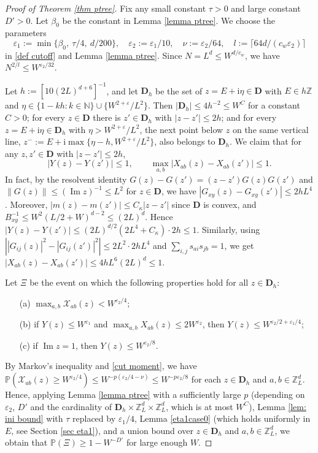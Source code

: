 \documentclass{article}
\newcommand{\1}{\mathds{1}}
\numberwithin{equation}{section}
\newcommand{\be}{\begin{equation}}
\newcommand{\ee}{\end{equation}}
\newcommand{\e}{{\varepsilon}}
\renewcommand{\cal}{\mathcal}
\newcommand{\ii}{\mathrm{i}} %
\renewcommand{\leq}{\leqslant}
\renewcommand{\geq}{\geqslant}
\renewcommand{\le}{\leq}
\renewcommand{\ge}{\geq}
\renewcommand{\P}{\mathbb{P}}
\newcommand{\N}{\mathbb{N}}
\newcommand{\Z}{\mathbb{Z}}
\DeclareMathOperator{\im}{Im}
\theoremstyle{plain} %
\theoremstyle{remark}
\begin{document}
 \begin{proof}[Proof of Theorem \ref{thm ptree}]
 Fix any small constant $\tau>0$ and large constant $D'>0$. Let $\beta_0$ be the constant in Lemma \ref{lemma ptree}. We choose the parameters
 	\be\label{net choice}
 	\e_1:=\min\{\beta_0,\ \tau/4,\ d/200\},\quad \e_2:=\e_1/10,\quad \nu:=\e_2/64,\quad l:=\lceil 64 d/(c_w\e_2)\rceil
 	\ee
in \eqref{def cutoff} and Lemma \ref{lemma ptree}. Since $N=L^d\le W^{d/c_w}$, we have $N^{2/l}\le W^{\e_2/32}$.

\medskip
{} Let $h:=[10(2L)^{d+6}]^{-1}$, and let $\mathbf D_h$ be the set of $z=E+\ii\eta\in \mathbf D$ with $E\in h\Z$ and $\eta\in \{1-kh: k\in \N\}\cup\{W^{2+\e}/L^2\}$. Then $|\mathbf D_h|\le 4h^{-2}\le W^{C}$ for a constant $C>0$; for every $z\in \mathbf D$ there is $z'\in \mathbf D_h$ with $|z-z'|\le 2h$; and for every $z=E+\ii \eta\in \mathbf D_h$ with $\eta>W^{2+\e}/L^2$, the next point below $z$ on the same vertical line, $z^-:=E+\ii\max\{\eta-h,W^{2+\e}/L^2\}$, also belongs to $\mathbf D_h$. We claim that for any $z,z'\in \mathbf D$ with $|z-z'|\le 2h$,
\be\label{net lip}
|Y(z)-Y(z')|\le 1,\qquad \max_{a,b}|X_{ab}(z)-X_{ab}(z')|\le 1.
\ee
In fact, by the resolvent identity $G(z)-G(z')=(z-z')G(z)G(z')$ and $\|G(z)\|\le (\im z)^{-1}\le L^2$ for $z\in \mathbf D$, we have $|G_{xy}(z)-G_{xy}(z')|\le 2hL^4$. Moreover, $|m(z)-m(z')|\le C_\kappa |z-z'|$ since $\mathbf D$ is convex, and $B_{xy}^{-1}\le W^2(L/2+W)^{d-2}\le (2L)^d$. Hence $|Y(z)-Y(z')|\le (2L)^{d/2}(2L^4+C_\kappa)\cdot 2h\le 1$. Similarly, using $\left||G_{ij}(z)|^2-|G_{ij}(z')|^2\right|\le 2L^2\cdot 2hL^4$ and $\sum_{i,j}s_{ai}s_{jb}=1$, we get $|X_{ab}(z)-X_{ab}(z')|\le 4hL^6(2L)^d\le 1$.

\medskip
{} Let $\Xi$ be the event on which the following properties hold for all $z\in \mathbf D_h$:
\begin{itemize}
\item[(a)] $\max_{a,b}\cal X_{ab}(z)< W^{\e_2/4}$;
\item[(b)] if $Y(z)\le W^{\e_1}$ and $\max_{a,b}X_{ab}(z)\le 2W^{\e_2}$, then $Y(z)\le W^{\e_2/2+\e_1/4}$;
\item[(c)] if $\im z=1$, then $Y(z)\le W^{\e_2/8}$.
\end{itemize}
By Markov's inequality and \eqref{cut moment}, we have $\P(\cal X_{ab}(z)\ge W^{\e_2/4})\le W^{-p(\e_2/4-\nu)}\le W^{-p\e_2/8}$ for each $z\in \mathbf D_h$ and $a,b\in \Z_L^d$. Hence, applying Lemma \ref{lemma ptree} with a sufficiently large $p$ (depending on $\e_2$, $D'$ and the cardinality of $\mathbf D_h\times \Z_L^d\times \Z_L^d$, which is at most $W^C$), Lemma \ref{lem: ini bound} with $\tau$ replaced by $\e_1/4$, Lemma \ref{eta1case0} (which holds uniformly in $E$, see Section \ref{sec eta1}), and a union bound over $z\in \mathbf D_h$ and $a,b\in \Z_L^d$, we obtain that $\P(\Xi)\ge 1-W^{-D'}$ for large enough $W$.


\end{proof}
\end{document}
